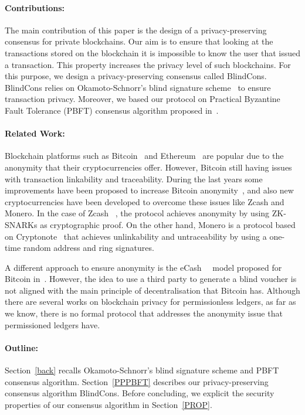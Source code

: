 \documentclass[conference]{IEEEtran}
\newcommand{\name}{BlindCons}
\begin{document}
\paragraph*{Contributions:} The main contribution of this paper is the design of a privacy-preserving consensus for private blockchains. Our aim is to ensure that looking at the transactions stored on the blockchain it is impossible to know the user that issued a transaction. This property increases the privacy  level of such blockchains. For this purpose, we design a privacy-preserving consensus called \name{}. \name{} relies on Okamoto-Schnorr's blind signature scheme~\cite{okamoto1992provably} to ensure transaction privacy. Moreover, we based our protocol on Practical Byzantine Fault Tolerance (PBFT) consensus algorithm proposed in~\cite{castro1999practical}.


\paragraph*{Related Work:}
Blockchain platforms such as Bitcoin~\cite{nakamoto2008bitcoin} and Ethereum~\cite{wood2014ethereum} are popular due to the anonymity that their cryptocurrencies offer. However, Bitcoin still having issues with transaction linkability and traceability.  During the last years some improvements have been proposed to increase Bitcoin anonymity~\cite{saxena2014increasing}, and also new cryptocurrencies have been developed to overcome these issues like Zcash and Monero. In the case of Zcash ~\cite{hopwood2016zcash}, the protocol achieves anonymity by using ZK-SNARKs as cryptographic proof. On the other hand, Monero is a protocol based on Cryptonote~\cite{van2013cryptonote} that achieves unlinkability and untraceability by using a one-time random address and ring signatures.

A different approach to ensure anonymity is the eCash~\cite{chaum1983blind}~\cite{chaum1988untraceable} model proposed for Bitcoin in~\cite{heilman2016blindly}. However, the idea to use a third party to generate a blind voucher is not aligned with the main principle of decentralisation that Bitcoin has. Although there are several works on blockchain privacy for permissionless ledgers, as far as we know, there is no formal protocol that addresses the anonymity issue that permissioned ledgers have.

\paragraph*{Outline:}  Section~\ref{back} recalls  Okamoto-Schnorr's blind signature scheme and PBFT consensus algorithm. Section~\ref{PPPBFT} describes our privacy-preserving consensus algorithm \name{}. Before concluding, we explicit the security properties of our consensus algorithm in Section~\ref{PROP}.
\end{document}
